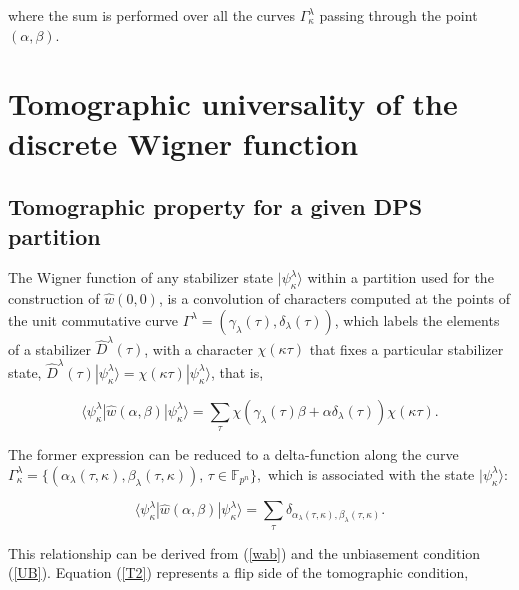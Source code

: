 \documentclass[quantumrep,article,submit,pdftex,moreauthors]{Definitions/mdpi}
\begin{document}
where the sum is performed over all the curves $\Gamma_{\kappa }^{\lambda }$
passing through the point $(\alpha,\beta)$. 

\section{Tomographic universality of the discrete Wigner function}

\subsection{Tomographic property for a given DPS partition}

The Wigner function of any stabilizer state $|\psi_{\kappa }^{\lambda}\rangle$
within a partition used for the construction of $\hat{w}\left(0,0\right)$, is a
convolution of characters computed at the points of the unit commutative curve
$\Gamma^{\lambda} = \left(\gamma_{\lambda}\left(\tau \right),
\delta_{\lambda}(\tau)\right)$, which labels the elements of a stabilizer
$\hat{D}^{\lambda}(\tau)$, with a character $\chi(\kappa \tau)$ that fixes a
particular stabilizer state, $\hat{D}^{\lambda}(\tau)|\psi_{\kappa
}^{\lambda}\rangle = \chi(\kappa \tau )|\psi_{\kappa}^{\lambda }\rangle$, that
is,

\begin{equation}
  \langle \psi_{\kappa }^{\lambda }
  |\hat{w}\left(\alpha,\beta\right)
  |\psi_{\kappa }^{\lambda }\rangle
  = \sum_{\tau } \chi\left(
    \gamma_{\lambda}(\tau) \beta + \alpha \delta_{\lambda}(\tau)
  \right)
  \chi(\kappa \tau).
  \label{T1}
\end{equation}

The former expression can be reduced to a delta-function along the curve
$\Gamma_{\kappa}^{\lambda} = \{(\alpha_{\lambda}(\tau,\kappa),
\beta_{\lambda}(\tau,\kappa)), \, \tau \in \mathbb{F}_{p^{n}}\},$ which is
associated with the state $|\psi_{\kappa}^{\lambda}\rangle$:

\begin{equation}
  \langle \psi_{\kappa }^{\lambda }
  |\hat{w}\left(\alpha,\beta\right)
  |\psi_{\kappa}^{\lambda}\rangle
  = \sum_{\tau}
  \delta_{\alpha_{\lambda}(\tau,\kappa), \beta_{\lambda}(\tau,\kappa )}.
  \label{T2}
\end{equation}

This relationship can be derived from (\ref{wab}) and the unbiasement
condition (\ref{UB}). Equation (\ref{T2}) represents a flip side of the
tomographic condition,
\end{document}
